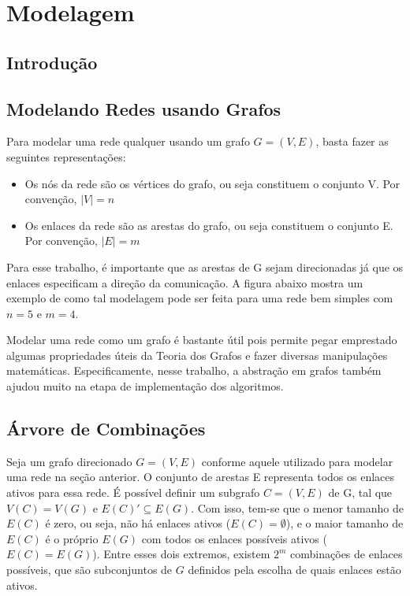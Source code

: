 \chapter{Modelagem}
\label{cap:modelagem}

\section{Introdução}


\section{Modelando Redes usando Grafos}

Para modelar uma rede qualquer usando um grafo $G=(V,E)$, basta fazer as seguintes representações:

\begin{itemize}
\item Os nós da rede são os vértices do grafo, ou seja constituem o conjunto V. Por convenção, $|V|=n$
\item Os enlaces da rede são as arestas do grafo, ou seja constituem o conjunto E. Por convenção, $|E|=m$
\end{itemize}

Para esse trabalho, é importante que as arestas de G sejam direcionadas já que os enlaces especificam a direção da comunicação. A figura abaixo mostra um exemplo de como tal modelagem pode ser feita para uma rede bem simples com $n=5$ e $m=4$.

Modelar uma rede como um grafo é bastante útil pois permite pegar emprestado algumas propriedades úteis da Teoria dos Grafos e fazer diversas manipulações matemáticas. Especificamente, nesse trabalho, a abstração em grafos também ajudou muito na etapa de implementação dos algoritmos.

\section{Árvore de Combinações}

Seja um grafo direcionado $G=(V,E)$ conforme aquele utilizado para modelar uma rede na seção anterior. O conjunto de arestas E representa todos os enlaces ativos para essa rede. É possível definir um subgrafo $C=(V,E)$ de G, tal que $V(C)=V(G)$ e $E(C)' \subseteq E(G)$. Com isso, tem-se que o menor tamanho de $E(C)$ é zero, ou seja, não há enlaces ativos ($E(C)=\emptyset$), e o maior tamanho de $E(C)$ é o próprio $E(G)$ com todos os enlaces possíveis ativos ($E(C)=E(G)$). Entre esses dois extremos, existem $2^m$ combinações de enlaces possíveis, que são subconjuntos de $G$ definidos pela escolha de quais enlaces estão ativos.

